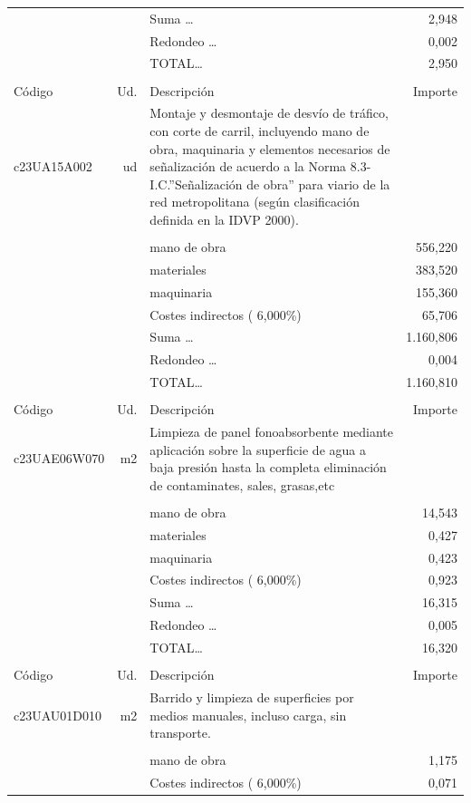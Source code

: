 \documentclass{book}%
\begin{document}
\begin{supertabular}{l r p{60mm} r}
&&Suma \ldots&     2,948\\%
&&Redondeo \ldots&     0,002\\%
%
&&TOTAL\ldots&     2,950\\%
&&&\\%
Código&Ud.&Descripción&Importe\\%
\hline%
c23UA15A002&ud&Montaje y desmontaje de desvío de tráfico, con corte de carril, incluyendo mano de obra, maquinaria y elementos necesarios de señalización de acuerdo a la Norma 8.3{-}I.C.”Señalización de obra” para viario de la red metropolitana (según clasificación definida en la IDVP 2000).&\\%
&&&\\%
&&mano de obra&   556,220\\%
&&materiales&   383,520\\%
&&maquinaria&   155,360\\%
&&Costes indirectos (     6,000\%)&    65,706\\%
&&Suma \ldots& 1.160,806\\%
&&Redondeo \ldots&     0,004\\%
%
&&TOTAL\ldots& 1.160,810\\%
&&&\\%
Código&Ud.&Descripción&Importe\\%
\hline%
c23UAE06W070&m2&Limpieza de panel fonoabsorbente mediante aplicación sobre la superficie de agua a baja presión hasta la completa eliminación de contaminates, sales, grasas,etc &\\%
&&&\\%
&&mano de obra&    14,543\\%
&&materiales&     0,427\\%
&&maquinaria&     0,423\\%
&&Costes indirectos (     6,000\%)&     0,923\\%
&&Suma \ldots&    16,315\\%
&&Redondeo \ldots&     0,005\\%
%
&&TOTAL\ldots&    16,320\\%
&&&\\%
Código&Ud.&Descripción&Importe\\%
\hline%
c23UAU01D010&m2&Barrido y limpieza de superficies por medios manuales, incluso carga, sin transporte.&\\%
&&&\\%
&&mano de obra&     1,175\\%
&&Costes indirectos (     6,000\%)&     0,071\\%

\end{supertabular}
\end{document}
